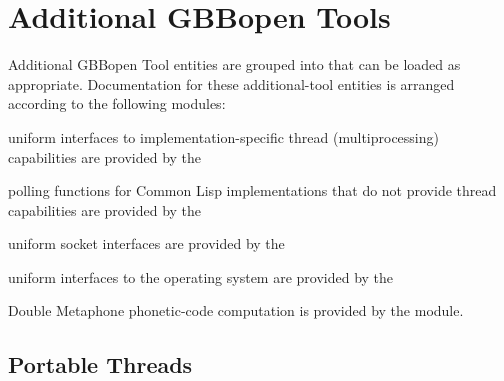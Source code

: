 \documentclass[10pt,twoside,english,pdftex]{article}
\begin{document}

\T\markright{}%
\T\pagestyle{plain}
\T\cleardoublepage
\W{}
\T\pagestyle{fancy}
\T\thispagestyle{fancybottom}
\T\global\def\fnlastname{ }%
\T\renewcommand{\headrulewidth}{0pt}
\section{Additional GBBopen Tools}
\label{sec:additional-tools}%

%
Additional GBBopen Tool entities are grouped into  that can be loaded as appropriate. Documentation for these additional-tool entities is arranged according to the following modules:
%
\begin{tightitemize}
%
\item uniform interfaces to implementation-specific thread (multiprocessing) capabilities are provided by the 
%
\item polling functions for Common Lisp implementations that do not provide thread capabilities are provided by the 
%
\item uniform socket interfaces are provided by the 
%
\item uniform interfaces to the operating system are provided by the 
%
\item Double Metaphone phonetic-code computation is provided by the  module.
%
\end{tightitemize}


\T\clearpage
\T\renewcommand{\headrulewidth}{0.01pt}


\T\markright{}%
\T\pagestyle{plain}
\T\clearpage
\W{}
\T\pagestyle{fancy}
\T\thispagestyle{fancybottom}
\T\global\def\fnlastname{ }%

\subsection{Portable Threads}
\label{sec:portablethreads}%
\end{document}
